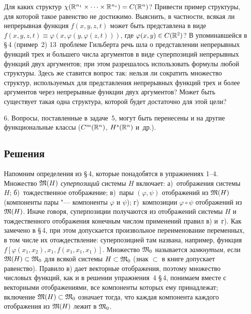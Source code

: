 Для каких структур $\chi(\mathbb R^{n_1}\times\dots\times\mathbb R^{n_s})=C(\mathbb R^n)$?
Привести пример структуры, для которой такое равенство не достижимо.
Выяснить, в частности, всякая ли непрерывная функция $f(x,y,z,t)$ может быть
представлена в виде $f(x,y,z,t)\equiv\varphi(x,\varphi(y,\varphi(z,t)))$,
где $\varphi(x,y)\in C(\mathbb R^2)$? В упоминавшейся в \S\,4 (пример~2)
13~проблеме Гильберта речь шла о представлении непрерывных функций трех и
большего числа аргументов в виде суперпозиций непрерывных функций двух
аргументов; при этом разрешалось использовать формулы любой структуры.
Здесь же ставится вопрос так: нельзя ли сократить множество структур,
используемых для представления непрерывных функций трех и более аргументов
через непрерывные функции двух аргументов? Может быть существует такая
одна структура, которой будет достаточно для этой цели?

6. Вопросы, поставленные в задаче~5, могут быть перенесены и на другие
функциональные классы ($C^m(\mathbb R^n)$, $H^s(\mathbb R^n)$ и~др.).

\subsection*{Решения}

Напомним определения из \S\,4, которые понадобятся в упражнениях 1--4.
Множество $\mathfrak M(H)$ \emph{суперпозиций} системы $H$ включает: а)~отображения
системы $H$; б)~тождественное отображение; в)~пары $(\varphi,\psi)$
отображений из $\mathfrak M(H)$ (компоненты пары "--- компоненты $\varphi$ и $\psi$);
г)~композиции $\varphi\circ\psi$ отображений из $\mathfrak M(H)$. Иначе говоря,
суперпозиции получаются из отображений системы $H$ и тождественного
отображения конечным числом применений правил в) и~г). Как замечено
в \S\,4, при этом допускается произвольное переименование переменных,
в том числе их отождествление: суперпозицией там названа, например, функция
$f[\varphi(x_1,x_2),x_1,f(x_1,x_1,x_1)]$. Множество $\mathfrak M_0$ называется
\emph{замкнутым}, если $\mathfrak M(H)\subset\mathfrak M_0$ для всякой системы $H\subset\mathfrak M_0$
(знак $\subset$ в книге допускает равенство). Правило в) дает векторные
отображения, поэтому множество числовых функций, как и в решении
упражнения~4 \S\,4, понимаем вместе с векторными отображениями, все
компоненты которых ему принадлежат; включение $\mathfrak M(H)\subset\mathfrak M_0$ означает
тогда, что каждая компонента каждого отображения из $\mathfrak M(H)$ лежит в $\mathfrak M_0$.

